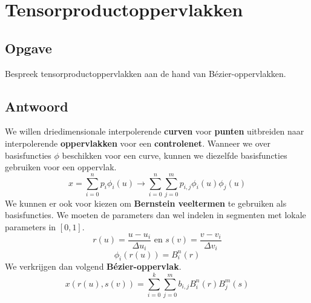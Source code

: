\documentclass[examenvragen.tex]{subfiles}
\begin{document}
\section{Tensorproductoppervlakken}
\subsection{Opgave}
Bespreek tensorproductoppervlakken aan de hand van B\'ezier-oppervlakken.

\subsection{Antwoord}
We willen driedimensionale interpolerende \textbf{curven} voor \textbf{punten} uitbreiden naar interpolerende \textbf{oppervlakken} voor een \textbf{controlenet}.
Wanneer we over basisfuncties $\phi$ beschikken voor een curve, kunnen we diezelfde basisfuncties gebruiken voor een oppervlak.
\[
x = \sum_{i=0}^{n}p_i\phi_{i}(u) \longrightarrow \sum_{i=0}^{n}\sum_{j=0}^{m}p_{i,j}\phi_{i}(u)\phi_{j}(u)
\]
We kunnen er ook voor kiezen om \textbf{Bernstein veeltermen} te gebruiken als basisfuncties. 
We moeten de parameters dan wel indelen in segmenten met lokale parameters in $[0,1]$.
\[
r(u) = \frac{u-u_i}{\Delta u_i} \text{ en } s(v) = \frac{v-v_i}{\Delta v_i}
\]
\[
\phi_{i}(r(u)) = B_{i}^{n}(r)
\]
We verkrijgen dan volgend 
\textbf{B\'ezier-oppervlak}.
\[
x(r(u),s(v)) = \sum_{i=0}^{k}\sum_{j=0}^{m}b_{i,j}B_{i}^{n}(r)B_{j}^{m}(s)
\]
\end{document}
